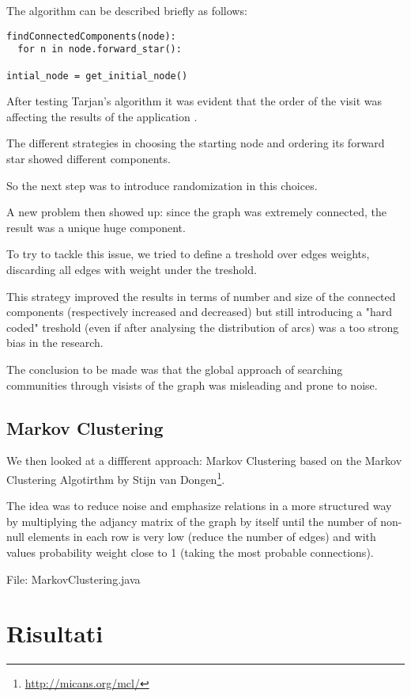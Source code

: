\documentclass[12pt,a4paper]{article}
\begin{document}
The algorithm can be described briefly as follows:
\begin{verbatim}
findConnectedComponents(node):
  for n in node.forward_star():
     
intial_node = get_initial_node()
\end{verbatim}

After testing Tarjan's algorithm it was evident that the order of the visit
was affecting the results of the application	.

The different strategies in choosing the starting node and ordering its forward
star showed different components.

So the next step was to introduce randomization in this choices.

A new problem then showed up: since the graph was extremely connected, the result
was a unique huge component.

To try to tackle this issue, we tried to define a treshold over edges weights, discarding all
edges with weight under the treshold.

This strategy improved the results in terms of number and size of the connected components
(respectively increased and decreased) but still introducing a "hard coded" treshold (even if
after analysing the distribution of arcs) was a too strong bias in the research.

The conclusion to be made was that the global approach of searching communities through visists
of the graph was misleading and prone to noise.

\subsection{Markov Clustering}

We then looked at a diffferent approach: Markov Clustering based on the Markov Clustering Algotirthm by Stijn van Dongen\footnote{\url{http://micans.org/mcl/}}.

The idea was to reduce noise and emphasize relations in a more structured way
by multiplying the adjancy matrix of the graph by itself until the number of
non-null elements in each row is very low (reduce the number of edges) and with
values probability weight close to 1 (taking the most probable connections).

File: MarkovClustering.java



\section{Risultati}
\label{results}
\end{document}
